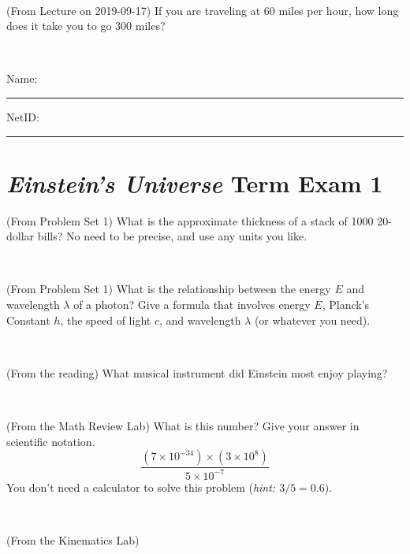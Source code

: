 \documentclass[12pt, letterpaper]{article}
\begin{document}
\vfill ~

\begin{problem} (From Lecture on 2019-09-17)
If you are traveling at 60 miles per hour, how long does
it take you to go 300 miles?
\end{problem}


\vfill ~


\cleardoublepage



\noindent
Name: \rule[-1ex]{0.60\textwidth}{0.1pt}
NetID: \rule[-1ex]{0.20\textwidth}{0.1pt}

\section*{\textsl{Einstein's Universe} Term Exam 1}
\setcounter{problem}{1}


\begin{problem} (From Problem Set 1)
What is the approximate thickness of a stack of 1000 20-dollar bills?
No need to be precise, and use any units you like.
\end{problem}


\vfill ~

\begin{problem} (From Problem Set 1)
What is the relationship between the energy $E$ and wavelength
$\lambda$ of a photon? Give a formula that involves energy $E$,
Planck's Constant $h$, the speed of light $c$, and wavelength
$\lambda$ (or whatever you need).
\end{problem}

\vfill ~

\begin{problem} (From the reading)
What musical instrument did Einstein most enjoy playing?
\end{problem}


\vfill ~

\begin{problem} (From the Math Review Lab)
What is this number? Give your answer in scientific notation.
$$
\frac{(7\times10^{-34})\times(3\times10^8)}{5\times10^{-7}}
$$
You don't need a calculator to solve this problem (\textit{hint: $3/5=0.6$}).
\end{problem}


\vfill ~


\clearpage


\begin{problem} (From the Kinematics Lab)

\end{problem}
\end{document}
